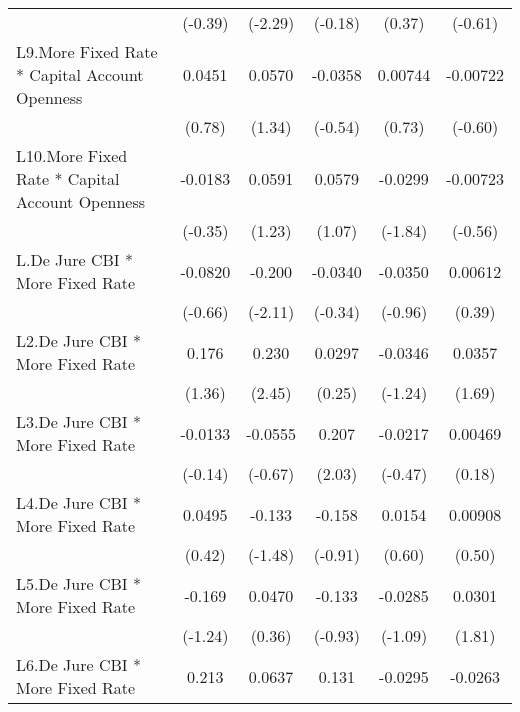 {\begin{tabular}{l*{5}{c}}
                &  (-0.39)         &  (-2.29)         &  (-0.18)         &   (0.37)         &  (-0.61)         \\
[1em]
L9.More Fixed Rate * Capital Account Openness&   0.0451         &   0.0570         &  -0.0358         &  0.00744         & -0.00722         \\
                &   (0.78)         &   (1.34)         &  (-0.54)         &   (0.73)         &  (-0.60)         \\
[1em]
L10.More Fixed Rate * Capital Account Openness&  -0.0183         &   0.0591         &   0.0579         &  -0.0299         & -0.00723         \\
                &  (-0.35)         &   (1.23)         &   (1.07)         &  (-1.84)         &  (-0.56)         \\
[1em]
L.De Jure CBI * More Fixed Rate&  -0.0820         &   -0.200\sym{*}  &  -0.0340         &  -0.0350         &  0.00612         \\
                &  (-0.66)         &  (-2.11)         &  (-0.34)         &  (-0.96)         &   (0.39)         \\
[1em]
L2.De Jure CBI * More Fixed Rate&    0.176         &    0.230\sym{*}  &   0.0297         &  -0.0346         &   0.0357         \\
                &   (1.36)         &   (2.45)         &   (0.25)         &  (-1.24)         &   (1.69)         \\
[1em]
L3.De Jure CBI * More Fixed Rate&  -0.0133         &  -0.0555         &    0.207\sym{*}  &  -0.0217         &  0.00469         \\
                &  (-0.14)         &  (-0.67)         &   (2.03)         &  (-0.47)         &   (0.18)         \\
[1em]
L4.De Jure CBI * More Fixed Rate&   0.0495         &   -0.133         &   -0.158         &   0.0154         &  0.00908         \\
                &   (0.42)         &  (-1.48)         &  (-0.91)         &   (0.60)         &   (0.50)         \\
[1em]
L5.De Jure CBI * More Fixed Rate&   -0.169         &   0.0470         &   -0.133         &  -0.0285         &   0.0301         \\
                &  (-1.24)         &   (0.36)         &  (-0.93)         &  (-1.09)         &   (1.81)         \\
[1em]
L6.De Jure CBI * More Fixed Rate&    0.213         &   0.0637         &    0.131         &  -0.0295         &  -0.0263         \\

\end{tabular}}
